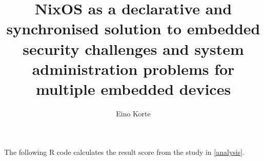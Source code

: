 \documentclass[language=english,version=final,mainfont=none,sharelatex=false]{utuftthesis}
\providecommand{\algorithmname}{Algoritmi}
\begin{document}
\title{NixOS as a declarative and synchronised solution to embedded security challenges and system administration problems for multiple embedded devices}
\author{Eino Korte}

\maketitle


\tableofcontents

\listoffigures

\listoftables

\listofacronyms

\renewcommand{\algorithmname}{\listingscaption}


\begin{comment}
To better organize things, create a new tex file for each chapter
and input it below.

Avoid using the å, ä, ö or <space> characters in referred names and
underscores \_ in file names (may break hyperref).

Good luck!
\end{comment}

    

%
%


\printbibliography

\begin{comment}
Important! Create the appendix chapters with command \textbackslash appchapter\{some
name\} instead of \textbackslash chapter\{some name\} for the automagic
page counting to work!
\end{comment}


 \label{pomdpappenix}

The following R code calculates the result score from the study in \ref{analysis}.
\end{document}
